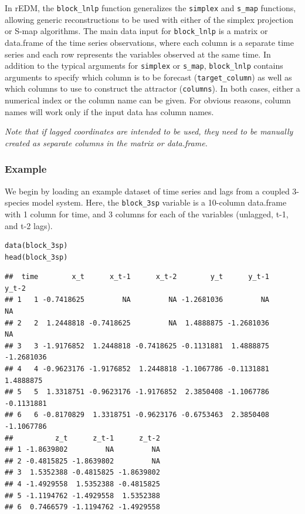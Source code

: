 In rEDM, the \lstinline{block_lnlp} function generalizes the \lstinline{simplex} and \lstinline{s_map} functions, allowing generic reconstructions to be used with either of the simplex projection or S-map algorithms. The main data input for \lstinline{block_lnlp} is a matrix or data.frame of the time series observations, where each column is a separate time series and each row represents the variables observed at the same time. In addition to the typical arguments for \lstinline{simplex} or \lstinline{s_map}, \lstinline{block_lnlp} contains arguments to specify which column is to be forecast (\lstinline{target_column}) as well as which columns to use to construct the attractor (\lstinline{columns}). In both cases, either a numerical index or the column name can be given. For obvious reasons, column names will work only if the input data has column names.

\emph{Note that if lagged coordinates are intended to be used, they need to be manually created as separate columns in the matrix or data.frame.}

\subsubsection{Example}

We begin by loading an example dataset of time series and lags from a coupled 3-species model system. Here, the \lstinline{block_3sp} variable is a 10-column data.frame with 1 column for time, and 3 columns for each of the variables (unlagged, t-1, and t-2 lags).

\begin{lstlisting}
data(block_3sp)
head(block_3sp)
\end{lstlisting}

\begin{lstlisting}[backgroundcolor=\color{white}, commentstyle=\ttfamily]
##  time        x_t      x_t-1      x_t-2        y_t      y_t-1      y_t-2
## 1   1 -0.7418625         NA         NA -1.2681036         NA         NA
## 2   2  1.2448818 -0.7418625         NA  1.4888875 -1.2681036         NA
## 3   3 -1.9176852  1.2448818 -0.7418625 -0.1131881  1.4888875 -1.2681036
## 4   4 -0.9623176 -1.9176852  1.2448818 -1.1067786 -0.1131881  1.4888875
## 5   5  1.3318751 -0.9623176 -1.9176852  2.3850408 -1.1067786 -0.1131881
## 6   6 -0.8170829  1.3318751 -0.9623176 -0.6753463  2.3850408 -1.1067786
##          z_t      z_t-1      z_t-2
## 1 -1.8639802         NA         NA
## 2 -0.4815825 -1.8639802         NA
## 3  1.5352388 -0.4815825 -1.8639802
## 4 -1.4929558  1.5352388 -0.4815825
## 5 -1.1194762 -1.4929558  1.5352388
## 6  0.7466579 -1.1194762 -1.4929558
\end{lstlisting}

